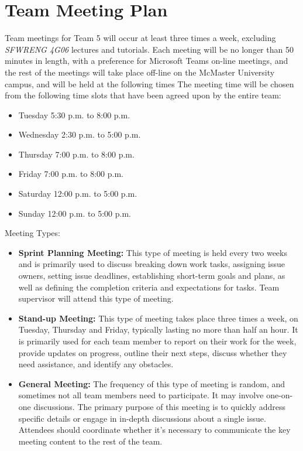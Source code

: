 \documentclass{article}
\begin{document}
\section{Team Meeting Plan}
Team meetings for Team 5 will occur at least three times a week, excluding \textit{SFWRENG 4G06} lectures and tutorials. Each meeting will be no longer than 50 minutes in length, with a preference for Microsoft Teams on-line meetings, and the rest of the meetings will take place off-line on the McMaster University campus, and will be held at the following times The meeting time will be chosen from the following time slots that have been agreed upon by the entire team: 
\begin{itemize}
    \item Tuesday 5:30 p.m. to 8:00 p.m.
    \item Wednesday 2:30 p.m. to 5:00 p.m.
    \item Thursday 7:00 p.m. to 8:00 p.m.
    \item Friday 7:00 p.m. to 8:00 p.m.
    \item Saturday 12:00 p.m. to 5:00 p.m.
    \item Sunday 12:00 p.m. to 5:00 p.m.
\end{itemize}
Meeting Types:
\begin{itemize}
    \item \textbf{Sprint Planning Meeting:} 
    This type of meeting is held every two weeks and is primarily used to discuss breaking down work tasks, assigning issue owners, setting issue deadlines, establishing short-term goals and plans, as well as defining the completion criteria and expectations for tasks. Team supervisor will attend this type of meeting.
    \item \textbf{Stand-up Meeting:}
   	This type of meeting takes place three times a week, on Tuesday, Thursday and Friday, typically lasting no more than half an hour. It is primarily used for each team member to report on their work for the week, provide updates on progress, outline their next steps, discuss whether they need assistance, and identify any obstacles.
    \item \textbf{General Meeting:}
    The frequency of this type of meeting is random, and sometimes not all team members need to participate. It may involve one-on-one discussions. The primary purpose of this meeting is to quickly address specific details or engage in in-depth discussions about a single issue. Attendees should coordinate whether it's necessary to communicate the key meeting content to the rest of the team.
\end{itemize}
\end{document}
